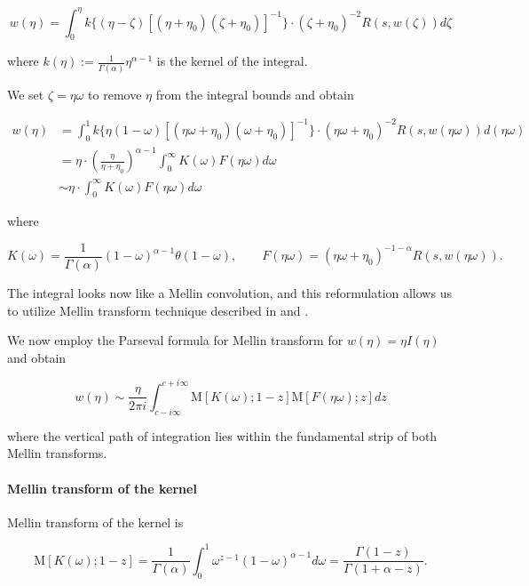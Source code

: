 \documentclass[12pt]{article}
\theoremstyle{plain}
\begin{document}
\begin{equation} \label{eq: reformulated volterra equation}
w(\eta) = \int _0 ^\eta k\{(\eta - \zeta)[(\eta + \eta_0)(\zeta + \eta_0)]^{-1}\} \cdot (\zeta + \eta _0) ^{-2} R(s, w(\zeta)) d\zeta
\end{equation}

where $k(\eta) := \frac{1}{\Gamma(\alpha)} \eta^{\alpha - 1}$ is the kernel of the integral.

We set $\zeta = \eta \omega$ to remove $\eta$ from the integral bounds and obtain

$$
\begin{aligned}
w(\eta) &= \int_0^1 k\{\eta(1-\omega)[(\eta\omega +\eta_0)(\omega + \eta_0)]^{-1}\} \cdot (\eta \omega + \eta _0) ^{-2} R(s, w(\eta \omega)) d(\eta\omega)\\[10pt]
&= \eta \cdot \left(\frac{\eta}{\eta+\eta_0}\right)^{\alpha-1} \int^\infty_0 K(\omega)F(\eta\omega)d\omega\\[10pt]
&\sim \eta \cdot \int^\infty_0 K(\omega)F(\eta\omega)d\omega
\end{aligned}
$$

where 

$$
K(\omega) = \frac{1}{\Gamma(\alpha)}(1-\omega)^{\alpha-1}\theta(1-\omega), \qquad F(\eta\omega) = (\eta\omega + \eta_0)^{-1-\alpha} R(s, w(\eta \omega)).
$$

The integral looks now like a Mellin convolution, and this reformulation allows us to utilize Mellin transform technique described in \cite{BH75} and \cite{BBO00}.

We now employ the Parseval formula for Mellin transform for $w(\eta) = \eta I(\eta)$ and obtain

$$
w(\eta) \sim \frac{\eta}{2 \pi i} \int_{c-i \infty}^{c+i \infty} \mathrm{M}[K(\omega) ; 1-z] \mathrm{M}[F(\eta \omega) ; z] d z
$$

where the vertical path of integration lies within the fundamental strip of both Mellin transforms.

\paragraph{Mellin transform of the kernel}

Mellin transform of the kernel is

\begin{equation}\label{eq: mellin transform of kernel}
\mathrm{M}[K(\omega) ; 1-z]=\frac{1}{\Gamma(\alpha)} \int_{0}^{1} \omega^{z-1}(1-\omega)^{\alpha-1} d \omega=\frac{\Gamma(1-z)}{\Gamma(1+\alpha-z)}.
\end{equation}
\end{document}
